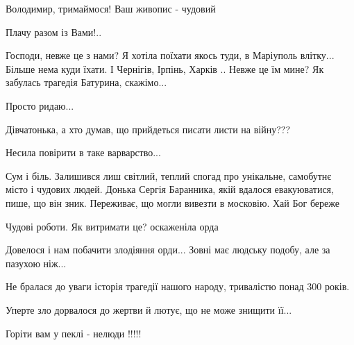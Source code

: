  
 
 
 
 

\qqSecCmt


Володимир, тримаймося! Ваш живопис - чудовий


Плачу разом із Вами!..


Господи, невже це з нами? Я хотіла поїхати якось туди, в Маріуполь влітку... Більше
нема куди їхати. І Чернігів, Ірпінь, Харків .. Невже це їм мине? Як забулась
трагедія Батурина, скажімо...


Просто ридаю...


Дівчатонька, а хто думав, що прийдеться писати листи на війну???


Несила повірити в таке варварство...


Сум і біль. Залишився лиш світлий, теплий спогад про унікальне, самобутнє місто
і чудових людей. Донька Сергія Баранника, якій вдалося евакуюватися, пише, що
він зник. Переживає, що могли вивезти в московію. Хай Бог береже


Чудові роботи. Як витримати це? оскаженіла орда


Довелося і нам побачити злодіяння орди... Зовні має людську подобу, але за
пазухою ніж...

Не бралася до уваги історія трагедії нашого народу, тривалістю понад 300 років.

Уперте зло дорвалося до жертви й лютує, що не може знищити її...

Горіти вам у пеклі - нелюди !!!!!


